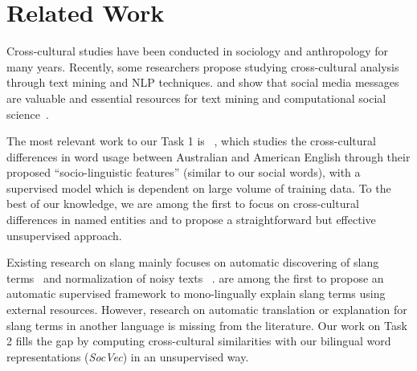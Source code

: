 \section{Related Work}
\label{sec:related}
Cross-cultural studies have been conducted in 
sociology and anthropology for many years. 
Recently, some researchers propose 
studying cross-cultural analysis through text mining and NLP techniques.
\citet{nakasaki2009visualizing} and 
\citet{elahi2012examination} show that 
social media messages  are valuable and essential resources for text mining and computational social science~\cite{Petrovic2010StreamingFS,Ritter2011NamedER,Paul2011YouAW,Rosenthal2015ICA,Wang2015ThatsSA,Rosenthal2015ICA,Zhang2015ContextawareEM,Peng2016ImprovingNE}. 

The most relevant work to our Task 1 is ~\citet{Garimella2016IdentifyingCD}, which studies the cross-cultural 
differences in word usage between Australian and American English through 
their proposed ``socio-linguistic features'' (similar to our social words), with a supervised model which is dependent on large volume of training data. 
To the best of our knowledge, we are among the first to focus on cross-cultural differences in named entities and to propose a straightforward but effective unsupervised approach.

Existing research on slang mainly focuses on automatic 
discovering of slang terms~\cite{elsahar2014a} and normalization of noisy texts ~\cite{han2012automatically}. 
\citet{ni2017learning} are among the first to propose an automatic 
supervised framework to mono-lingually explain slang terms using 
external resources.
However, research on automatic translation or explanation for slang terms 
in another language is missing from the literature. 
Our work on Task 2 fills the gap by computing cross-cultural similarities 
with our bilingual word representations (\textit{SocVec}) in an 
unsupervised way.

